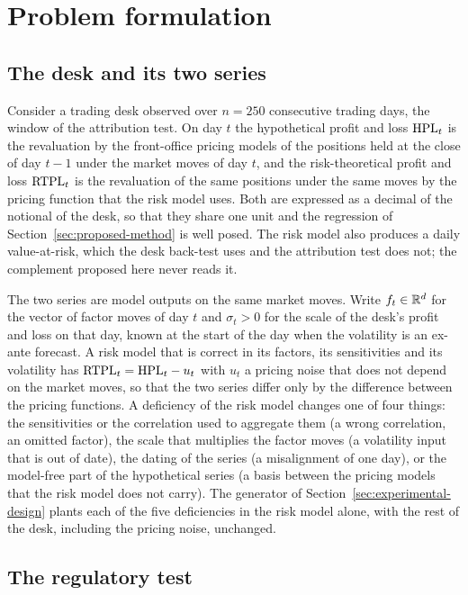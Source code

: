 \section{Problem formulation}
\label{sec:problem}

\subsection{The desk and its two series}
\label{sec:problem-desk}

Consider a trading desk observed over $n=250$ consecutive trading days, the window of the attribution test.
On day $t$ the hypothetical profit and loss $\mathrm{HPL}_t$ is the revaluation by the front-office pricing models of the positions held at the close of day $t-1$ under the market moves of day $t$, and the risk-theoretical profit and loss $\mathrm{RTPL}_t$ is the revaluation of the same positions under the same moves by the pricing function that the risk model uses.
Both are expressed as a decimal of the notional of the desk, so that they share one unit and the regression of Section~\ref{sec:proposed-method} is well posed.
The risk model also produces a daily value-at-risk, which the desk back-test uses and the attribution test does not; the complement proposed here never reads it.

The two series are model outputs on the same market moves.
Write $f_t\in\mathbb{R}^d$ for the vector of factor moves of day $t$ and $\sigma_t>0$ for the scale of the desk's profit and loss on that day, known at the start of the day when the volatility is an ex-ante forecast.
A risk model that is correct in its factors, its sensitivities and its volatility has $\mathrm{RTPL}_t=\mathrm{HPL}_t-u_t$ with $u_t$ a pricing noise that does not depend on the market moves, so that the two series differ only by the difference between the pricing functions.
A deficiency of the risk model changes one of four things: the sensitivities or the correlation used to aggregate them (a wrong correlation, an omitted factor), the scale that multiplies the factor moves (a volatility input that is out of date), the dating of the series (a misalignment of one day), or the model-free part of the hypothetical series (a basis between the pricing models that the risk model does not carry).
The generator of Section~\ref{sec:experimental-design} plants each of the five deficiencies in the risk model alone, with the rest of the desk, including the pricing noise, unchanged.

\subsection{The regulatory test}
\label{sec:problem-regulatory}

